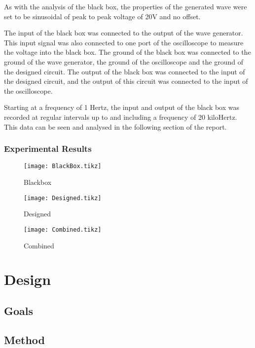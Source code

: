 \documentclass[12pt]{article} %
\begin{document}
As with the analysis of the black box, the properties of the generated wave were set to be sinusoidal of peak to peak voltage of 20V and no offset.

The input of the black box was connected to the output of the wave generator. This input signal was also connected to one port of the oscilloscope to measure the voltage into the black box. The ground of the black box was connected to the ground of the wave generator, the ground of the oscilloscope and the ground of the designed circuit. The output of the black box was connected to the input of the designed circuit, and the output of this circuit was connected to the input of the oscilloscope.

Starting at a frequency of 1 Hertz, the input and output of the black box was recorded at regular intervals up to and including a frequency of 20 kiloHertz. This data can be seen and analysed in the following section of the report.

\subsubsection{Experimental Results}

\begin{figure}
 	\centering
	\texttt{[image: BlackBox.tikz]}
	\caption{Blackbox}
\end{figure}

\begin{figure}
 	\centering
	\texttt{[image: Designed.tikz]}
	\caption{Designed}
\end{figure}

\begin{figure}
 	\centering
	\texttt{[image: Combined.tikz]}
	\caption{Combined}
\end{figure}

\pagebreak





\section{Design}

\subsection{Goals}


\subsection{Method}
\end{document}
